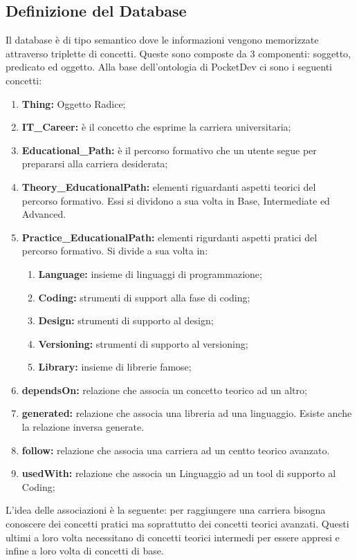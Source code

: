 \subsection{Definizione del Database}
Il database è di tipo semantico dove le informazioni vengono memorizzate attraverso triplette di concetti. Queste sono composte da 3 componenti: soggetto, predicato ed oggetto. Alla base dell'ontologia di PocketDev ci sono i seguenti concetti:
\begin{enumerate}
 \item \textbf{Thing:} Oggetto Radice;
 \item \textbf{IT\_Career:} è il concetto che esprime la carriera universitaria;
 \item \textbf{Educational\_Path:} è il percorso formativo che un utente segue per prepararsi alla carriera desiderata;
 \item \textbf{Theory\_EducationalPath:} elementi riguardanti aspetti teorici del percorso formativo. Essi si dividono a sua volta in Base, Intermediate ed Advanced.
 \item \textbf{Practice\_EducationalPath:} elementi rigurdanti aspetti pratici del percorso formativo. Si divide a sua volta in:
 \begin{enumerate}
  \item \textbf{Language:} insieme di linguaggi di programmazione;
  \item \textbf{Coding:} strumenti di support alla fase di coding;
  \item \textbf{Design:} strumenti di supporto al design;
  \item \textbf{Versioning:} strumenti di supporto al versioning;
  \item \textbf{Library:} insieme di librerie famose;
 \end{enumerate}
 \item \textbf{dependsOn:} relazione che associa un concetto teorico ad un altro;
 \item \textbf{generated:} relazione che associa una libreria ad una linguaggio. Esiste anche la relazione inversa generate.
 \item \textbf{follow:} relazione che associa una carriera ad un centto teorico avanzato.
 \item \textbf{usedWith:} relazione che associa un Linguaggio ad un tool di supporto al Coding;
\end{enumerate}
L'idea delle associazioni è la seguente: per raggiungere una carriera bisogna conoscere dei concetti pratici ma soprattutto dei concetti teorici avanzati. Questi ultimi a loro volta necessitano di concetti teorici intermedi per essere appresi e infine a loro volta di concetti di base.
